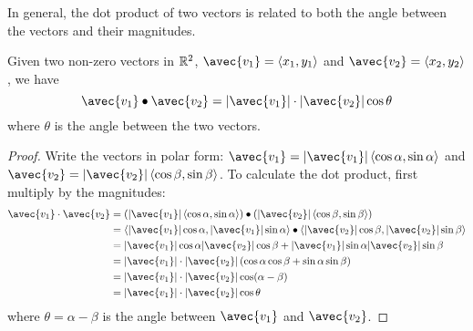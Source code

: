 \documentclass[handout]{ximera}
\begin{document}
\begin{image}
\end{image}

In general, the dot product of two vectors is related to both the angle between the vectors and their magnitudes.

\begin{proposition}
Given two non-zero vectors in $\mathbb R^2$, $\avec{v_1} = \vector{x_1, y_1}$ and $\avec{v_2} = \vector{x_2, y_2}$, we have
\[
\avec{v_1} \dotp \avec{v_2} = |\avec{v_1}| \cdot |\avec{v_2}| \cos \theta
\]
where $\theta$ is the angle between the two vectors.
\begin{proof}
Write the vectors in polar form: $\avec{v_1} = |\avec{v_1}| \vector{\cos \alpha, \sin \alpha}$ and 
$\avec{v_2} = |\avec{v_2}| \vector{\cos \beta, \sin \beta}$. To calculate the dot product, first multiply by the magnitudes:
\begin{align*}
\avec{v_1} \cdot \avec{v_2} & = \left(|\avec{v_1}| \vector{\cos \alpha, \sin \alpha}\right) \dotp \left( |\avec{v_2}| \vector{\cos \beta, \sin \beta} \right)\\
                            &= \vector{|\avec{v_1}|\cos \alpha, |\avec{v_1}|\sin \alpha} \dotp   \vector{|\avec{v_2}|\cos \beta, |\avec{v_2}|\sin \beta} \\
                            &= |\avec{v_1}| \cos \alpha |\avec{v_2}|\cos \beta + |\avec{v_1}|\sin \alpha |\avec{v_2}|\sin \beta\\
                            &= |\avec{v_1}|\cdot |\avec{v_2}| \left(\cos \alpha \cos \beta + \sin \alpha \sin \beta\right)\\
                            &= |\avec{v_1}| \cdot|\avec{v_2}| \cos(\alpha - \beta)\\
                            &= |\avec{v_1}| \cdot |\avec{v_2}| \cos \theta
\end{align*}
where $\theta = \alpha - \beta$ is the angle between $\avec{v_1}$ and $\avec{v_2}$.
\end{proof}
\end{proposition}
\end{document}
